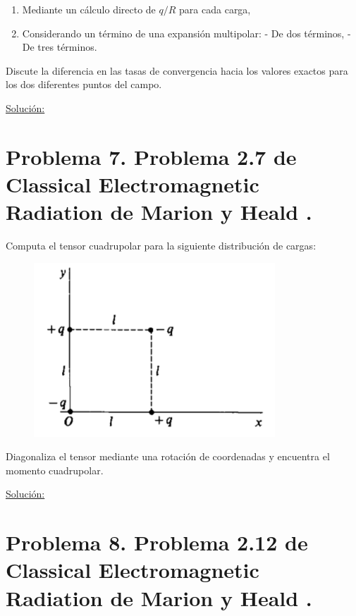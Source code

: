 \documentclass[a4paper,11pt]{article}
\numberwithin{equation}{section}
\begin{document}
\begin{enumerate}[label=\textbf{(\alph*)}]
\item Mediante un cálculo directo de $q/R$ para cada carga,
\item Considerando un término de una expansión multipolar:
\subitem - De dos términos,
\subitem - De tres términos.
\end{enumerate}

Discute la diferencia en las tasas de convergencia hacia los valores exactos para 
los dos diferentes puntos del campo.

\vspace{.3cm}

\underline{Solución:} \vspace{.3cm}

\section{Problema 7. Problema 2.7 de Classical Electromagnetic Radiation
de Marion y Heald \cite{marion2}.}

Computa el tensor cuadrupolar para la siguiente distribución de cargas:

\begin{figure}[H]
\center
 \includegraphics[scale=0.6]{problema7fig1}
\end{figure}

Diagonaliza el tensor mediante una rotación de coordenadas y encuentra el momento
cuadrupolar.

\vspace{.3cm}

\underline{Solución:} \vspace{.3cm}

\section{Problema 8. Problema 2.12 de Classical Electromagnetic Radiation
de Marion y Heald \cite{marion2}.}
\end{document}

